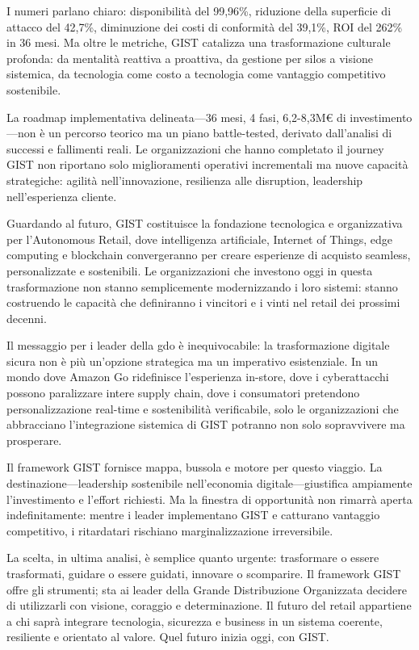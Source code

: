 I numeri parlano chiaro: disponibilità del 99,96\%, riduzione della superficie di attacco del 42,7\%, diminuzione dei costi di conformità del 39,1\%, ROI del 262\% in 36 mesi. Ma oltre le metriche, GIST catalizza una trasformazione culturale profonda: da mentalità reattiva a proattiva, da gestione per silos a visione sistemica, da tecnologia come costo a tecnologia come vantaggio competitivo sostenibile.

La roadmap implementativa delineata—36 mesi, 4 fasi, 6,2-8,3M€ di investimento—non è un percorso teorico ma un piano battle-tested, derivato dall'analisi di successi e fallimenti reali. Le organizzazioni che hanno completato il journey GIST non riportano solo miglioramenti operativi incrementali ma nuove capacità strategiche: agilità nell'innovazione, resilienza alle disruption, leadership nell'esperienza cliente.

Guardando al futuro, GIST costituisce la fondazione tecnologica e organizzativa per l'Autonomous Retail, dove intelligenza artificiale, Internet of Things, edge computing e blockchain convergeranno per creare esperienze di acquisto seamless, personalizzate e sostenibili. Le organizzazioni che investono oggi in questa trasformazione non stanno semplicemente modernizzando i loro sistemi: stanno costruendo le capacità che definiranno i vincitori e i vinti nel retail dei prossimi decenni.

Il messaggio per i leader della \gls{gdo} è inequivocabile: la trasformazione digitale sicura non è più un'opzione strategica ma un imperativo esistenziale. In un mondo dove Amazon Go ridefinisce l'esperienza in-store, dove i cyberattacchi possono paralizzare intere supply chain, dove i consumatori pretendono personalizzazione real-time e sostenibilità verificabile, solo le organizzazioni che abbracciano l'integrazione sistemica di GIST potranno non solo sopravvivere ma prosperare.

Il framework GIST fornisce mappa, bussola e motore per questo viaggio. La destinazione—leadership sostenibile nell'economia digitale—giustifica ampiamente l'investimento e l'effort richiesti. Ma la finestra di opportunità non rimarrà aperta indefinitamente: mentre i leader implementano GIST e catturano vantaggio competitivo, i ritardatari rischiano marginalizzazione irreversibile.

La scelta, in ultima analisi, è semplice quanto urgente: trasformare o essere trasformati, guidare o essere guidati, innovare o scomparire. Il framework GIST offre gli strumenti; sta ai leader della Grande Distribuzione Organizzata decidere di utilizzarli con visione, coraggio e determinazione. Il futuro del retail appartiene a chi saprà integrare tecnologia, sicurezza e business in un sistema coerente, resiliente e orientato al valore. Quel futuro inizia oggi, con GIST.

\clearpage
\printbibliography[
    heading=subbibliography,
    title={Riferimenti Bibliografici del Capitolo 5},
]

